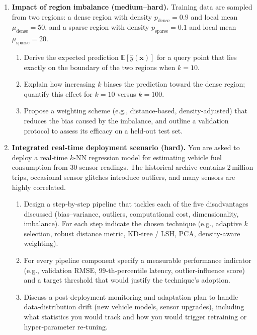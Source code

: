 \documentclass[12pt, a4paper]{article}
\begin{document}
\begin{enumerate}
    \item \textbf{Impact of region imbalance (medium–hard).}  
    Training data are sampled from two regions: a dense region with density \(p_{\text{dense}}=0.9\) and local mean \(\mu_{\text{dense}}=50\), and a sparse region with density \(p_{\text{sparse}}=0.1\) and local mean \(\mu_{\text{sparse}}=20\).  
    \begin{enumerate}
        \item Derive the expected prediction \(\mathbb{E}[\hat y(\mathbf{x})]\) for a query point that lies exactly on the boundary of the two regions when \(k=10\).  
        \item Explain how increasing \(k\) biases the prediction toward the dense region; quantify this effect for \(k=10\) versus \(k=100\).  
        \item Propose a weighting scheme (e.g., distance‑based, density‑adjusted) that reduces the bias caused by the imbalance, and outline a validation protocol to assess its efficacy on a held‑out test set.
    \end{enumerate}

    \item \textbf{Integrated real‑time deployment scenario (hard).}  
    You are asked to deploy a real‑time \(k\)-NN regression model for estimating vehicle fuel consumption from 30 sensor readings. The historical archive contains 2 million trips, occasional sensor glitches introduce outliers, and many sensors are highly correlated.  
    \begin{enumerate}
        \item Design a step‑by‑step pipeline that tackles each of the five disadvantages discussed (bias–variance, outliers, computational cost, dimensionality, imbalance).  For each step indicate the chosen technique (e.g., adaptive \(k\) selection, robust distance metric, KD‑tree / LSH, PCA, density‑aware weighting).  
        \item For every pipeline component specify a measurable performance indicator (e.g., validation RMSE, 99‑th‑percentile latency, outlier‑influence score) and a target threshold that would justify the technique’s adoption.  
        \item Discuss a post‑deployment monitoring and adaptation plan to handle data‑distribution drift (new vehicle models, sensor upgrades), including what statistics you would track and how you would trigger retraining or hyper‑parameter re‑tuning.
    \end{enumerate}
\end{enumerate}
\end{document}
